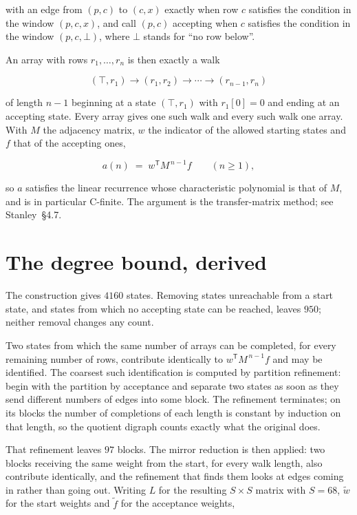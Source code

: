 \documentclass[11pt]{article}
\theoremstyle{definition}
\begin{document}
with an edge from $(p,c)$ to $(c,x)$ exactly when row $c$ satisfies the condition in the window $(p,c,x)$, and call $(p,c)$ accepting when $c$ satisfies the condition in the window $(p,c,\bot)$, where $\bot$ stands for ``no row below''.

An array with rows $r_1,\dots,r_n$ is then exactly a walk

\[(\top,r_1) \to (r_1,r_2) \to \cdots \to (r_{n-1},r_n)\]

of length $n-1$ beginning at a state $(\top,r_1)$ with $r_1[0]=0$ and ending at an accepting state. Every array gives one such walk and every such walk one array. With $M$ the adjacency matrix, $w$ the indicator of the allowed starting states and $f$ that of the accepting ones,

\[a(n) \;=\; w^{\mathsf T} M^{\,n-1} f \qquad (n \ge 1),\]

so $a$ satisfies the linear recurrence whose characteristic polynomial is that of $M$, and is in particular C-finite. The argument is the transfer-matrix method; see Stanley~\S4.7.

\section{The degree bound, derived}

The construction gives $4160$ states. Removing states unreachable from a start state, and states from which no accepting state can be reached, leaves $950$; neither removal changes any count.

Two states from which the same number of arrays can be completed, for every remaining number of rows, contribute identically to $w^{\mathsf T}M^{\,n-1}f$ and may be identified. The coarsest such identification is computed by partition refinement: begin with the partition by acceptance and separate two states as soon as they send different numbers of edges into some block. The refinement terminates; on its blocks the number of completions of each length is constant by induction on that length, so the quotient digraph counts exactly what the original does.

That refinement leaves $97$ blocks. The mirror reduction is then applied: two blocks receiving the same weight from the start, for every walk length, also contribute identically, and the refinement that finds them looks at edges coming in rather than going out. Writing $L$ for the resulting $S \times S$ matrix with $S = 68$, $\tilde w$ for the start weights and $\tilde f$ for the acceptance weights,
\end{document}
